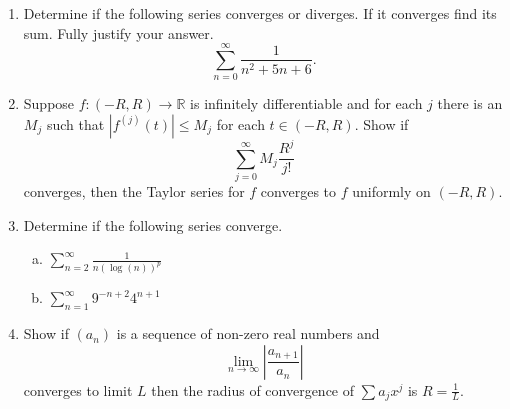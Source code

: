 \documentclass[12pt,letterpaper]{article}
\theoremstyle{plain}
\theoremstyle{definition}
\begin{document}
\begin{enumerate}[1.]
\item Determine if the following series converges or diverges. If it converges find its sum. Fully justify your answer. 
\[\sum_{n=0}^\infty \dfrac{1}{n^2+5n+6}.\]
\item Suppose $f:(-R, R)\rightarrow \mathbb{R}$ is infinitely differentiable and for each $j$ there is an $M_j$ such that $|f^{(j)}(t)|\leq M_j$ for each $t\in (-R, R)$. Show if 
\[\sum_{j=0}^\infty M_j \frac{R^j}{j!} \]
converges, then the Taylor series for $f$ converges to $f$ uniformly on $(-R, R)$.  
\item Determine if the following series converge.
\begin{enumerate}[a)]
\item $\sum_{n=2}^\infty \frac{1}{n(\log(n))^p}$
\item $\sum_{n=1}^\infty 9^{-n+2}4^{n+1}$
\end{enumerate}
\item Show if $(a_n)$ is a sequence of non-zero real numbers and 
\[\lim_{n\rightarrow\infty}\left|\frac{a_{n+1}}{a_n}\right|\] converges to limit $L$ then the radius of convergence of $\sum a_j x^j$ is $R=\frac{1}{L}$.


\end{enumerate}
\end{document}
